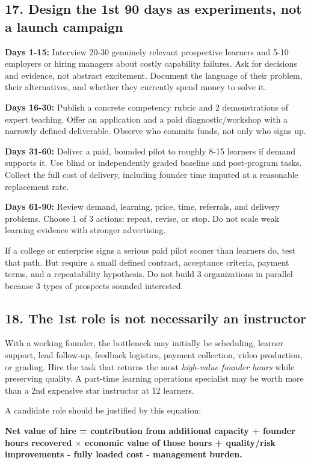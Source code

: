 \subsection{17. Design the 1st 90 days as experiments, not a launch campaign}

\textbf{Days 1-15:} Interview 20-30 genuinely relevant prospective learners and 5-10 employers or hiring managers about costly capability failures. Ask for decisions and evidence, not abstract excitement. Document the language of their problem, their alternatives, and whether they currently spend money to solve it.

\textbf{Days 16-30:} Publish a concrete competency rubric and 2 demonstrations of expert teaching. Offer an application and a paid diagnostic/\allowbreak workshop with a narrowly defined deliverable. Observe who commits funds, not only who signs up.

\textbf{Days 31-60:} Deliver a paid, bounded pilot to roughly 8-15 learners if demand supports it. Use blind or independently graded baseline and post-program tasks. Collect the full cost of delivery, including founder time imputed at a reasonable replacement rate.

\textbf{Days 61-90:} Review demand, learning, price, time, referrals, and delivery problems. Choose 1 of 3 actions: repeat, revise, or stop. Do not scale weak learning evidence with stronger advertising.

If a college or enterprise signs a serious paid pilot sooner than learners do, test that path. But require a small defined contract, acceptance criteria, payment terms, and a repeatability hypothesis. Do not build 3 organizations in parallel because 3 types of prospects sounded interested.

\subsection{18. The 1st role is not necessarily an instructor}

With a working founder, the bottleneck may initially be scheduling, learner support, lead follow-up, feedback logistics, payment collection, video production, or grading. Hire the task that returns the most \textit{high-value founder hours} while preserving quality. A part-time learning operations specialist may be worth more than a 2nd expensive star instructor at 12 learners.

A candidate role should be justified by this equation:

\textbf{Net value of hire = contribution from additional capacity + founder hours recovered $\times$ economic value of those hours + quality/\allowbreak risk improvements - fully loaded cost - management burden.}

